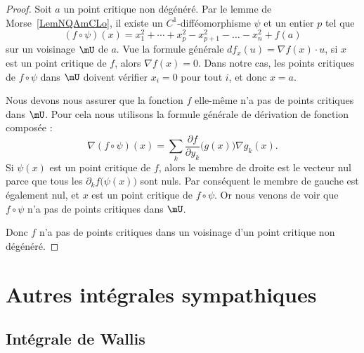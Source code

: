 \begin{proof}
	Soit \( a\) un point critique non dégénéré. Par le lemme de Morse~\ref{LemNQAmCLo}, il existe un \( C^1\)-difféomorphisme \( \psi\) et un entier \( p\) tel que
	\begin{equation}
		(f\circ \psi)(x)=x_1^2+\cdots +x_p^2-x_{p+1}^2-\ldots -x_n^2+f(a)
	\end{equation}
	sur un voisinage \( \mU\) de \( a\). Vue la formule générale \( df_x(u)=\nabla f(x)\cdot u\), si \( x\) est un point critique de \( f\), alors \( \nabla f(x)=0\). Dans notre cas, les points critiques de \( f\circ \psi\) dans \( \mU\) doivent vérifier \( x_i=0\) pour tout \( i\), et donc \( x=a\).

	Nous devons nous assurer que la fonction \( f\) elle-même n'a pas de points critiques dans \( \mU\). Pour cela nous utilisons la formule générale de dérivation de fonction composée :
	\begin{equation}
		\nabla(f\circ\psi)(x)=\sum_k \frac{ \partial f }{ \partial y_k }\big( g(x) \big)\nabla g_k(x).
	\end{equation}
	Si \( \psi(x)\) est un point critique de \( f\), alors le membre de droite est le vecteur nul parce que tous les \( \partial_kf\big( \psi(x) \big)\) sont nuls. Par conséquent le membre de gauche est également nul, et \( x\) est un point critique de \( f\circ\psi\). Or nous venons de voir que \( f\circ\psi\) n'a pas de points critiques dans \( \mU\).

	Donc \( f\) n'a pas de points critiques dans un voisinage d'un point critique non dégénéré.
\end{proof}


\section{Autres intégrales sympathiques}

\subsection{Intégrale de Wallis}

